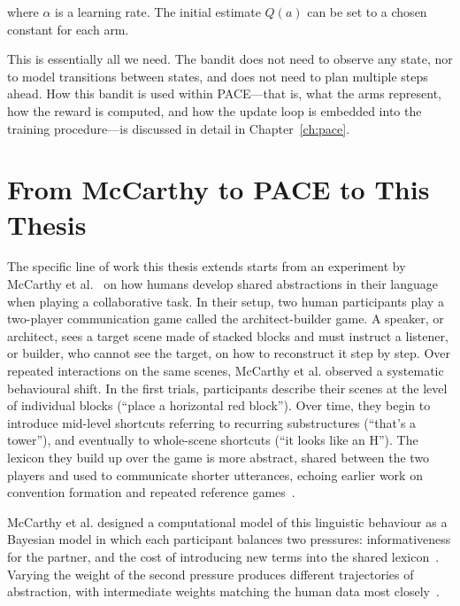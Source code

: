 where $\alpha$ is a learning rate. The initial estimate $Q(a)$ can be set to a chosen constant for each arm.

This is essentially all we need. The bandit does not need to observe any state, nor to model transitions between states, and does not need to plan multiple steps ahead. How this bandit is used within PACE---that is, what the arms represent, how the reward is computed, and how the update loop is embedded into the training procedure---is discussed in detail in Chapter~\ref{ch:pace}.

\section{From McCarthy to PACE to This Thesis}
\label{sec:bg-mccarthy-pace-thesis}

The specific line of work this thesis extends starts from an experiment by McCarthy et al.~\cite{mccarthy_learning_2021} on how humans develop shared abstractions in their language when playing a collaborative task. In their setup, two human participants play a two-player communication game called the architect-builder game. A speaker, or architect, sees a target scene made of stacked blocks and must instruct a listener, or builder, who cannot see the target, on how to reconstruct it step by step. Over repeated interactions on the same scenes, McCarthy et al. observed a systematic behavioural shift. In the first trials, participants describe their scenes at the level of individual blocks (``place a horizontal red block''). Over time, they begin to introduce mid-level shortcuts referring to recurring substructures (``that's a tower''), and eventually to whole-scene shortcuts (``it looks like an H''). The lexicon they build up over the game is more abstract, shared between the two players and used to communicate shorter utterances, echoing earlier work on convention formation and repeated reference games~\cite{hawkins_convention-formation_2017,hawkins_characterizing_2020}.

McCarthy et al. designed a computational model of this linguistic behaviour as a Bayesian model in which each participant balances two pressures: informativeness for the partner, and the cost of introducing new terms into the shared lexicon~\cite{mccarthy_learning_2021,goodman_pragmatic_2016}. Varying the weight of the second pressure produces different trajectories of abstraction, with intermediate weights matching the human data most closely~\cite{mccarthy_learning_2021}.

